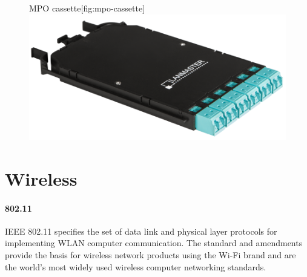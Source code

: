 \begin{figure}
\begin{sidecaption}{\acs{MPO} cassette}[fig:mpo-cassette]
   \centering
   \includegraphics[width=\textwidth]{images/physical/mpo-cassette.png}
\end{sidecaption}
\end{figure}






\section{Wireless}
\label{sec:wireless}

\paragraph{802.11}
\acs{IEEE} 802.11 specifies the set of %
data link and physical layer protocols for implementing \acf{WLAN} computer communication.
The standard and amendments provide the basis for wireless network products using the Wi-Fi brand and are the world's most widely used wireless computer networking standards.

